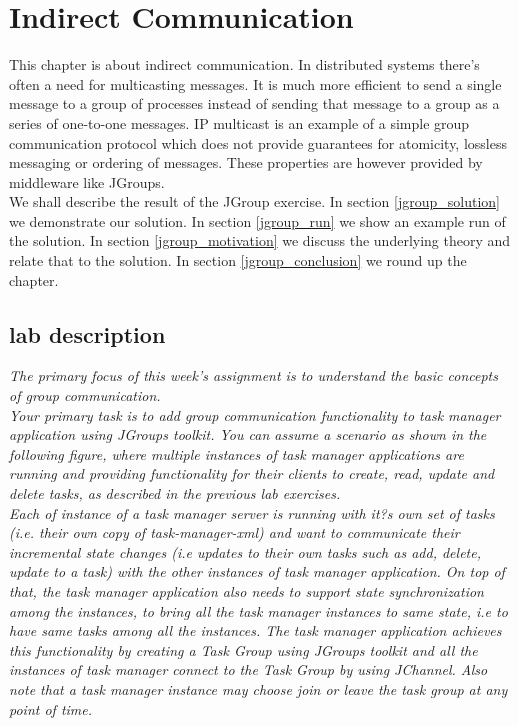 \chapter{Indirect Communication}
\minitoc


This chapter is about indirect communication. In distributed systems there's often a need for multicasting messages. It is much more efficient to send a single message to a group of processes instead of sending that message to a group as a series of one-to-one messages. IP multicast is an example of a simple group communication protocol which does not provide guarantees for atomicity, lossless messaging or ordering of messages. These properties are however provided by middleware like JGroups.  \\

We shall describe the result of the JGroup exercise. In section \ref{jgroup_solution} we demonstrate our solution. In section \ref{jgroup_run} we show an example run of the solution. In section \ref{jgroup_motivation} we discuss the underlying theory and relate that to the solution. In section \ref{jgroup_conclusion} we round up the chapter.


\section{lab description}

\textit{The primary focus of this week's assignment is to understand the basic concepts of group communication.} \\

\textit{Your primary task is to add group communication functionality to task manager application using JGroups toolkit. You can assume a scenario as shown in the following figure, where multiple instances of task manager applications are running and providing functionality for their clients to create, read, update and delete tasks, as described in the previous lab exercises.}\\

\textit{Each of instance of a task manager server is running with it?s own set of tasks (i.e. their own copy of task-manager-xml) and want to communicate their incremental state changes (i.e updates to their own tasks such as add, delete, update to a task) with the other instances of task manager application.  On top of that, the task manager application also needs to support state synchronization among the instances, to bring all the task manager instances to same state, i.e to have same tasks among all the instances. The task manager application  achieves this functionality by creating a Task Group using JGroups toolkit and all the instances of task manager connect to the Task Group by using JChannel. Also note that a task manager instance may choose join or leave the task group at any point of time.}\\


